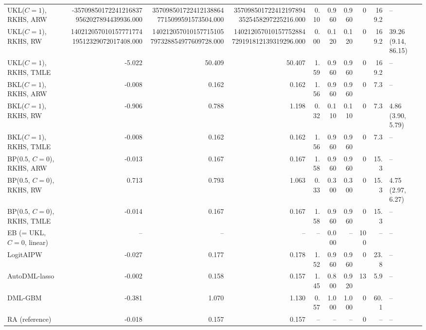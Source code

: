 \begin{tabular}{lrrrrrrrrl}
UKL($C=1$), RKHS, ARW & -357098501722412168379562027894439936.000 & 3570985017224121388647715099591573504.000 & 3570985017224121978943525458297225216.000 & 0.10 & 0.960 & 0.960 & 0 & 169.2 & -- \\
UKL($C=1$), RKHS, RW & 14021205701015777177419512329072017408.000 & 140212057010157715105797328854977609728.000 & 140212057010157752884729191812139319296.000 & 0.00 & 0.120 & 0.120 & 0 & 169.2 & 39.26 (9.14, 86.15) \\
UKL($C=1$), RKHS, TMLE & -5.022 & 50.409 & 50.407 & 1.59 & 0.960 & 0.960 & 0 & 169.2 & -- \\
BKL($C=1$), RKHS, ARW & -0.008 & 0.162 & 0.162 & 1.56 & 0.960 & 0.960 & 0 & 7.3 & -- \\
BKL($C=1$), RKHS, RW & -0.906 & 0.788 & 1.198 & 0.32 & 0.110 & 0.110 & 0 & 7.3 & 4.86 (3.90, 5.79) \\
BKL($C=1$), RKHS, TMLE & -0.008 & 0.162 & 0.162 & 1.56 & 0.960 & 0.960 & 0 & 7.3 & -- \\
BP($0.5$, $C=0$), RKHS, ARW & -0.013 & 0.167 & 0.167 & 1.58 & 0.960 & 0.960 & 0 & 15.3 & -- \\
BP($0.5$, $C=0$), RKHS, RW & 0.713 & 0.793 & 1.063 & 0.33 & 0.300 & 0.300 & 0 & 15.3 & 4.75 (2.97, 6.27) \\
BP($0.5$, $C=0$), RKHS, TMLE & -0.014 & 0.167 & 0.167 & 1.58 & 0.960 & 0.960 & 0 & 15.3 & -- \\
EB (= UKL, $C=0$, linear) & -- & -- & -- & -- & 0.000 & -- & 100 & -- & -- \\
LogitAIPW & -0.027 & 0.177 & 0.178 & 1.52 & 0.960 & 0.960 & 0 & 23.8 & -- \\
AutoDML-lasso & -0.002 & 0.158 & 0.157 & 1.45 & 0.800 & 0.920 & 13 & 5.9 & -- \\
DML-GBM & -0.381 & 1.070 & 1.130 & 0.57 & 1.000 & 1.000 & 0 & 60.1 & -- \\
RA (reference) & -0.018 & 0.157 & 0.157 & -- & -- & -- & 0 & -- & -- \\
\hline
\end{tabular}
